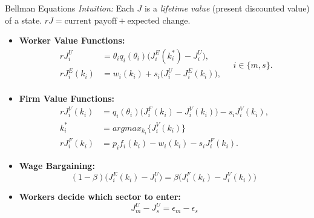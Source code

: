 \documentclass[9pt,xcolor={svgnames}]{beamer}
\begin{document}
\begin{frame}{Bellman Equations}
\textit{Intuition:} Each $J$ is a \emph{lifetime value} (present discounted value) of a state.
$rJ = \text{current payoff} + \text{expected change}.$

\vspace{1em}
  \begin{itemize}
    \item \textbf{Worker Value Functions:}
      \[
      \begin{aligned}
        rJ_i^U &= \theta_i q_i(\theta_i)\big(J_i^E(k^*_i)-J_i^U\big),\\
        rJ_i^E(k_i) &= w_i(k_i) + s_i\big(J_i^U-J_i^E(k_i)\big), \\
      \end{aligned}
      \quad i\in\{m,s\}.
      \]
    \item \textbf{Firm Value Functions:}
      \[
      \begin{aligned}
        rJ_i^V(k_i) &=  q_i(\theta_i)\big(J_i^F(k_i)-J_i^V(k_i)\big) - s_i J^V_i(k_i), \\
         k_i^*&= argmax_{k_i} \{ J_i^V(k_i) \} \\
       rJ_i^F(k_i) &= p_i f_i(k_i) - w_i(k_i) - s_i J_i^F(k_i).
      \end{aligned}
      \]
      
    \item \textbf{Wage Bargaining:}
      \[
        (1-\beta)\bigl(J^E_i(k_i) - J^U_i\bigr)
        = \beta\bigl(J^F_i(k_i) - J^V_i(k_i)\bigr)\
      \]

    \item \textbf{Workers decide which sector to enter:}
\[
   J^U_m  - J^U_s  = \epsilon_m - \epsilon_s
\]
      
  \end{itemize}
\end{frame}
\end{document}
